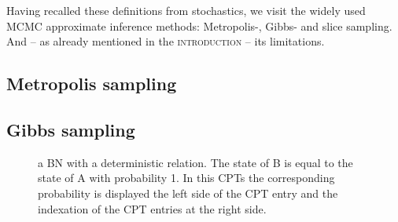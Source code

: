 \documentclass[a4paper, twoside, 11pt]{report}
\theoremstyle{plain}
\theoremstyle{definition}
\theoremstyle{remark}
\begin{document}
Having recalled these definitions from stochastics, we visit the widely used MCMC approximate inference methods: Metropolis-, Gibbs- and slice sampling. And -- as already mentioned in the {\normalfont\scshape\sffamily introduction} -- its limitations.


\subsection{Metropolis sampling}


\subsection{Gibbs sampling}
\begin{center}
\begin{figure}[h!]
\centering
{}
\caption{a BN with a deterministic relation. The state of B is equal to the state of A with probability 1. In this CPTs the corresponding probability is displayed the left side of the CPT entry and the indexation of the CPT entries at the right side.}
\label{gibbs}
\end{figure}
\end{center}
\end{document}
